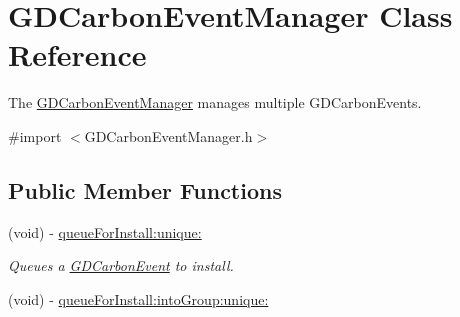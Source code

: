 \hypertarget{interface_g_d_carbon_event_manager}{
\section{GDCarbonEventManager Class Reference}
\label{interface_g_d_carbon_event_manager}
}


The \hyperlink{interface_g_d_carbon_event_manager}{GDCarbonEventManager} manages multiple GDCarbonEvents.  


{\ttfamily \#import $<$GDCarbonEventManager.h$>$}\subsection*{Public Member Functions}
\begin{DoxyCompactItemize}
\item 
(void) -\/ \hyperlink{interface_g_d_carbon_event_manager_a1eddf82bb8d798147c3fcde4aa81ed34}{queueForInstall:unique:}
\begin{DoxyCompactList}\small\item\em Queues a \hyperlink{interface_g_d_carbon_event}{GDCarbonEvent} to install. \item\end{DoxyCompactList}\item 
\hypertarget{interface_g_d_carbon_event_manager_acd4af2477bd18676f423097a0f4e802b}{
(void) -\/ \hyperlink{interface_g_d_carbon_event_manager_acd4af2477bd18676f423097a0f4e802b}{queueForInstall:intoGroup:unique:}}
\label{interface_g_d_carbon_event_manager_acd4af2477bd18676f423097a0f4e802b}


\end{DoxyCompactItemize}
